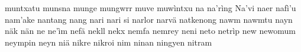 \documentclass[a4paper]{article}
\begin{document}
muntxatu\hspace{2mm}
munsna\hspace{2mm}
munge\hspace{2mm}
mungwrr\hspace{2mm}
muve\hspace{2mm}
muwìntxu\hspace{2mm}
na\hspace{2mm}
na'rìng\hspace{2mm}
Na'vi\hspace{2mm}
naer\hspace{2mm}
nafì'u\hspace{2mm}
nam'ake\hspace{2mm}
nantang\hspace{2mm}
nang\hspace{2mm}
nari\hspace{2mm}
nari si\hspace{2mm}
narlor\hspace{2mm}
narvä\hspace{2mm}
natkenong\hspace{2mm}
nawm\hspace{2mm}
nawmtu\hspace{2mm}
nayn\hspace{2mm}
näk\hspace{2mm}
nän\hspace{2mm}
ne\hspace{2mm}
ne'ìm\hspace{2mm}
nefä\hspace{2mm}
nekll\hspace{2mm}
nekx\hspace{2mm}
nemfa\hspace{2mm}
nemrey\hspace{2mm}
neni\hspace{2mm}
neto\hspace{2mm}
netrìp\hspace{2mm}
new\hspace{2mm}
newomum\hspace{2mm}
neympin\hspace{2mm}
neyn\hspace{2mm}
niä\hspace{2mm}
nikre\hspace{2mm}
nikroi\hspace{2mm}
nim\hspace{2mm}
ninan\hspace{2mm}
ningyen\hspace{2mm}
nitram\hspace{2mm}
\end{document}
